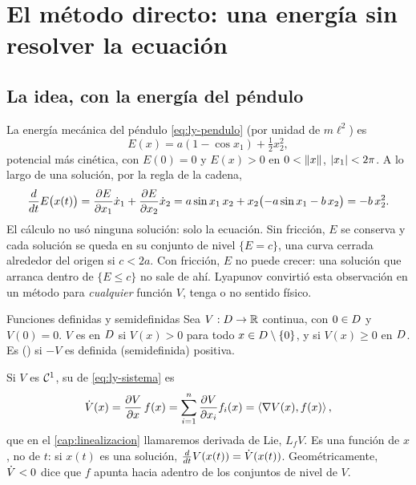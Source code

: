 \section{El método directo: una energía sin resolver la ecuación}
\label{sec:ly-directo}

\subsection{La idea, con la energía del péndulo}

La energía mecánica del péndulo \eqref{eq:ly-pendulo} (por unidad de $m\ell^2$) es
\begin{equation}
  E(x)=a(1-\cos x_1)+\tfrac12x_2^2 ,
  \label{eq:ly-energia}
\end{equation}
potencial más cinética, con $E(0)=0$ y $E(x)>0$ en $0<\left\lVert x\right\rVert$, $\left\lvert x_1\right\rvert<2\pi$. A lo largo de una solución, por la regla de la cadena,
\[
  \frac{d}{dt}E\bigl(x(t)\bigr)=\frac{\partial E}{\partial x_1}\dot x_1+\frac{\partial E}{\partial x_2}\dot x_2=a\sin x_1\,x_2+x_2\bigl(-a\sin x_1-b\,x_2\bigr)=-b\,x_2^2 .
\]
El cálculo no usó ninguna solución: solo la ecuación. Sin fricción, $E$ se conserva y cada solución se queda en su conjunto de nivel $\{E=c\}$, una curva cerrada alrededor del origen si $c<2a$. Con fricción, $E$ no puede crecer: una solución que arranca dentro de $\{E\le c\}$ no sale de ahí. Lyapunov convirtió esta observación en un método para \emph{cualquier} función $V$, tenga o no sentido físico.

\begin{definicion}[label=def:ly-definida]{Funciones definidas y semidefinidas}
Sea $V:D\to\mathbb{R}$ continua, con $0\in D$ y $V(0)=0$. $V$ es  en $D$ si $V(x)>0$ para todo $x\in D\setminus\{0\}$, y  si $V(x)\ge0$ en $D$. Es  ()  si $-V$ es definida (semidefinida) positiva.
\end{definicion}

Si $V$ es $\mathcal{C}^{1}$, su  de \eqref{eq:ly-sistema} es
\begin{equation}
  \dot V(x)=\frac{\partial V}{\partial x}\,f(x)=\sum_{i=1}^n\frac{\partial V}{\partial x_i}f_i(x)=\left\langle \nabla V(x),f(x)\right\rangle ,
  \label{eq:ly-vdot}
\end{equation}
que en el \cref{cap:linealizacion} llamaremos derivada de Lie, $L_fV$. Es una función de $x$, no de $t$: si $x(t)$ es una solución, $\frac{d}{dt}V(x(t))=\dot V(x(t))$. Geométricamente, $\dot V<0$ dice que $f$ apunta hacia adentro de los conjuntos de nivel de $V$.


